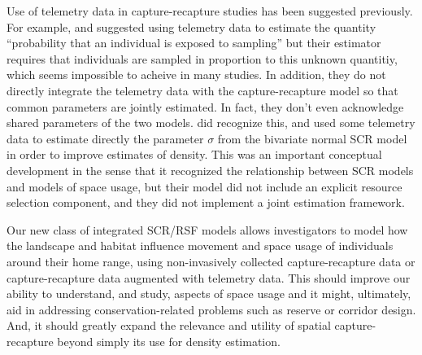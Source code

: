 Use of telemetry data in capture-recapture studies has been suggested
previously. For example, \citet{white_shenk:2001} and
\citet{ivan:2012} suggested using telemetry data to estimate the
quantity ``probability that an individual is exposed to sampling'' but
their estimator requires that individuals are sampled in proportion to
this unknown quantitiy, which seems impossible to acheive in many
studies. In addition, they do not directly integrate the telemetry
data with the capture-recapture model so that common parameters are
jointly estimated. In fact, they don't even acknowledge shared
parameters of the two models.  \citet{sollmann_etal:inprep} did
recognize this, and used some telemetry data to estimate directly the
parameter $\sigma$ from the bivariate normal SCR model in order to
improve estimates of density. This was an important conceptual
development in the sense that it recognized the relationship between
SCR models and models of space usage, but their model did not include
an explicit resource selection component, and they did not implement a
joint estimation framework.

Our new class of integrated SCR/RSF models allows investigators to model how the landscape and
habitat influence movement and space usage of individuals around their
home range, using non-invasively collected capture-recapture data or
capture-recapture data augmented with telemetry data.  This should
improve our ability to understand, and study, aspects of space usage
and it might, ultimately, aid in addressing conservation-related
problems such as reserve or corridor design. And, it should greatly
expand the relevance and utility of spatial capture-recapture beyond
simply its use for density estimation.



